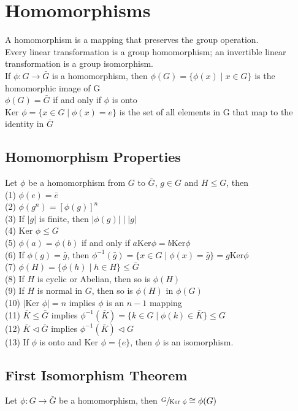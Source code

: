 \documentclass{article}
\begin{document}
\section{Homomorphisms}
A homomorphism is a mapping that preserves the group operation. \\
Every linear transformation is a group homomorphism; an invertible linear transformation is a group isomorphism. \\
If $\phi: G \to \bar{G}$ is a homomorphism, then $\phi(G) = \{\phi(x) \mid x \in G\}$ is the homomorphic image of G \\
$\phi(G) = \bar{G}$ if and only if $\phi$ is onto \\
$\text{Ker }\phi = \{x \in G \mid \phi(x) = e\}$ is the set of all elements in G that map to the identity in $\bar{G}$
\subsection{Homomorphism Properties}
Let $\phi$ be a homomorphism from $G$ to $\bar{G}$, $g \in G$ and $H \leq G$, then \\
(1) $\phi(e) = \bar{e}$ \\
(2) $\phi(g^n) = [\phi(g)]^n $ \\
(3) If $|g|$ is finite, then $|\phi(g)| \mid |g|$ \\
(4) $\text{Ker } \phi \leq G$ \\
(5) $\phi(a) = \phi(b)$ if and only if $a\text{Ker}\phi = b\text{Ker}\phi$ \\
(6) If $\phi(g) = \bar{g}$, then $\phi^{-1}(\bar{g}) = \{x \in G \mid \phi(x) = \bar{g}\} = g\text{Ker}\phi$ \\
(7) $\phi(H) = \{\phi(h) \mid h\in H\} \leq \bar{G}$ \\
(8) If $H$ is cyclic or Abelian, then so is $\phi(H)$ \\
(9) If $H$ is normal in $G$, then so is $\phi(H)$ in $\phi(G)$ \\
(10) $|\text{Ker }\phi| = n$ implies $\phi$ is an $n-1$ mapping \\
(11) $\bar{K} \leq \bar{G}$ implies $\phi^{-1}(\bar{K}) = \{k \in G \mid \phi(k) \in \bar{K}\} \leq G$ \\
(12) $\bar{K} \triangleleft \bar{G}$ implies $\phi^{-1}(\bar{K}) \triangleleft G$ \\
(13) If $\phi$ is onto and $\text{Ker } \phi = \{e\}$, then $\phi$ is an isomorphism.

\subsection{First Isomorphism Theorem}
Let $\phi: G \to \bar{G}$ be a homomorphism, then $\sfrac{G}{\text{Ker }\phi} \cong \phi(G)$ 
\end{document}
